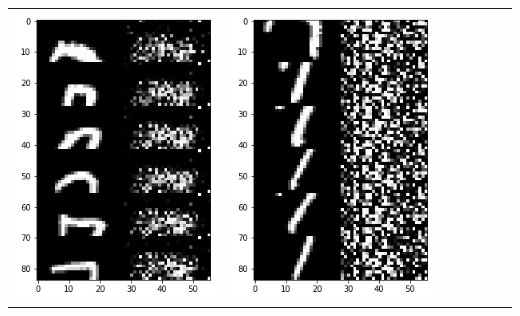 \documentclass[12pt]{report} %
\begin{document}
\begin{tabular}{m{0.7cm}m{2.4cm}m{2.4cm}m{2.4cm}m{2.4cm}m{2.4cm}m{2.4cm}}
	\includegraphics[scale=0.3]{pictures/M2_7_up.png} & \includegraphics[scale=0.3]{pictures/M2_7_down.png}\\

\end{tabular}
\end{document}
